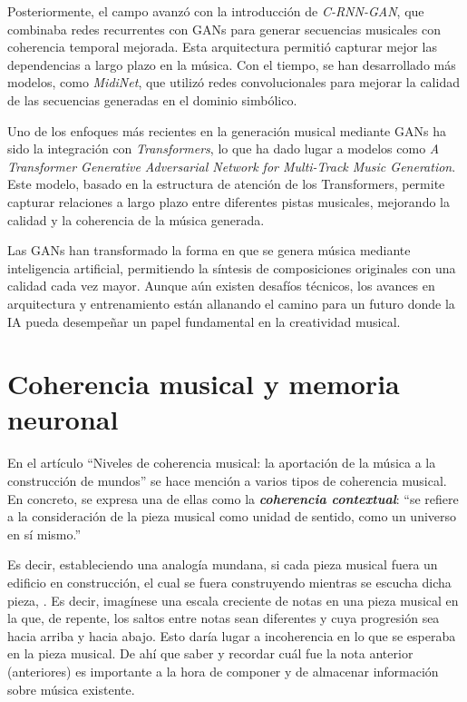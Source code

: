 Posteriormente, el campo avanzó con la introducción de \emph{C-RNN-GAN}, que combinaba redes recurrentes con GANs para generar secuencias musicales con coherencia temporal mejorada. Esta arquitectura permitió capturar mejor las dependencias a largo plazo en la música. Con el tiempo, se han desarrollado más modelos, como \emph{MidiNet}, que utilizó redes convolucionales para mejorar la calidad de las secuencias generadas en el dominio simbólico.

Uno de los enfoques más recientes en la generación musical mediante GANs ha sido la integración con \emph{Transformers}, lo que ha dado lugar a modelos como \emph{A Transformer Generative Adversarial Network for Multi-Track Music Generation}. Este modelo, basado en la estructura de atención de los Transformers, permite capturar relaciones a largo plazo entre diferentes pistas musicales, mejorando la calidad y la coherencia de la música generada.

Las GANs han transformado la forma en que se genera música mediante inteligencia artificial, permitiendo la síntesis de composiciones originales con una calidad cada vez mayor. Aunque aún existen desafíos técnicos, los avances en arquitectura y entrenamiento están allanando el camino para un futuro donde la IA pueda desempeñar un papel fundamental en la creatividad musical.

\section{Coherencia musical y memoria neuronal}

En el artículo ``Niveles de coherencia musical: la aportación de la música a la construcción de mundos''\citep{sibetrans2025coherencia} se hace mención a varios tipos de coherencia musical. En concreto, se expresa una de ellas como la \emph{\textbf{coherencia contextual}}: ``se refiere a la consideración de la pieza musical como unidad de sentido, como un universo en sí mismo.''

Es decir, estableciendo una analogía mundana, si cada pieza musical fuera un edificio en construcción, el cual se fuera construyendo mientras se escucha dicha pieza, . Es decir, imagínese una escala creciente de notas en una pieza musical en la que, de repente, los saltos entre notas sean diferentes y cuya progresión sea hacia arriba y hacia abajo. Esto daría lugar a incoherencia en lo que se esperaba en la pieza musical. De ahí que saber y recordar cuál fue la nota anterior (anteriores) es importante a la hora de componer y de almacenar información sobre música existente.

